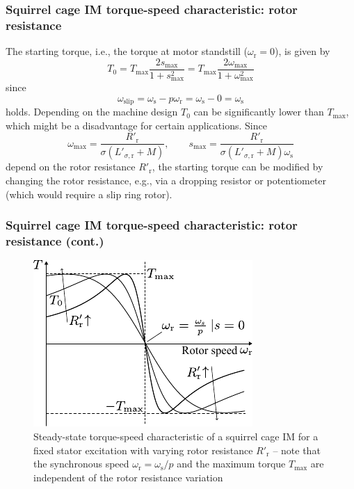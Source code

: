 \begin{frame}
	\frametitle{Squirrel cage IM torque-speed characteristic: rotor resistance} 
    The starting torque, i.e., the torque at motor standstill ($\omega_\mathrm{r}=0$), is given by
    \begin{equation}
        T_0 = T_\mathrm{max}  \frac{2s_\mathrm{max}}{1+s^2_\mathrm{max}} = T_\mathrm{max}  \frac{2\omega_\mathrm{max}}{1+\omega^2_\mathrm{max}}
    \end{equation}
    since 
    $$\omega_\mathrm{slip} = \omega_{\mathrm{s}} - p \omega_{\mathrm{r}} = \omega_{\mathrm{s}} - 0 = \omega_{\mathrm{s}} $$
    holds. Depending on the machine design $T_0$ can be significantly lower than $T_\mathrm{max}$, which might be a disadvantage for certain applications. Since
    $$\omega_\mathrm{max}=\frac{R'_\mathrm{r}}{\sigma (L'_{\sigma,\mathrm{r}} +M)}, \qquad s_\mathrm{max} = \frac{R'_\mathrm{r}}{\sigma (L'_{\sigma,\mathrm{r}} +M)\omega_\mathrm{s}} $$
    depend on the rotor resistance $R'_\mathrm{r}$, the starting torque can be modified by changing the rotor resistance, e.g., via a dropping resistor or potentiometer (which would require a slip ring rotor).
\end{frame}

\begin{frame}
	\frametitle{Squirrel cage IM torque-speed characteristic: rotor resistance (cont.)} 
    \begin{figure}
        \centering
        \includegraphics[height=0.65\textheight]{fig/lec06/Kloss_formula_starting_torque.pdf}
        \caption{Steady-state torque-speed characteristic of a squirrel cage IM for a fixed stator excitation with varying rotor resistance $R'_\mathrm{r}$ -- note that the synchronous speed $\omega_\mathrm{r}=\omega_\mathrm{s}/p$ and the maximum torque $T_\mathrm{max}$ are independent of the rotor resistance variation}
        \label{fig:Kloss_formula_starting_torque}
    \end{figure}
\end{frame}

